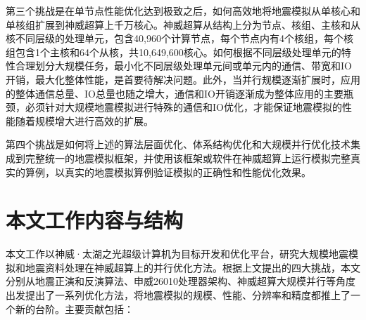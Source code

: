 第三个挑战是在单节点性能优化达到极致之后，如何高效地将地震模拟从单核心和单核组扩展到神威超算上千万核心。神威超算从结构上分为节点、核组、主核和从核不同层级的处理单元，包含40,960个计算节点，每个节点内有4个核组，每个核组包含1个主核和64个从核，共10,649,600核心。如何根据不同层级处理单元的特性合理划分大规模任务，最小化不同层级处理单元间或单元内的通信、带宽和IO开销，最大化整体性能，是首要待解决问题。此外，当并行规模逐渐扩展时，应用的整体通信总量、IO总量也随之增大，通信和IO开销逐渐成为整体应用的主要瓶颈，必须针对大规模地震模拟进行特殊的通信和IO优化，才能保证地震模拟的性能随着规模增大进行高效的扩展。

第四个挑战是如何将上述的算法层面优化、体系结构优化和大规模并行优化技术集成到完整统一的地震模拟框架，并使用该框架或软件在神威超算上运行模拟完整真实的算例，以真实的地震模拟算例验证模拟的正确性和性能优化效果。

\section{本文工作内容与结构}

本文工作以神威·太湖之光超级计算机为目标开发和优化平台，研究大规模地震模拟和地震资料处理在神威超算上的并行优化方法。根据上文提出的四大挑战，本文分别从地震正演和反演算法、申威26010处理器架构、神威超算大规模并行等角度出发提出了一系列优化方法，将地震模拟的规模、性能、分辨率和精度都推上了一个新的台阶。主要贡献包括：

